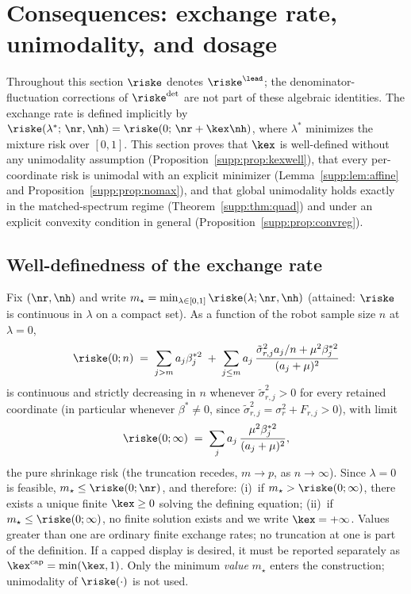 \section{Consequences: exchange rate, unimodality, and dosage}
\label{supp:t2}

Throughout this section $\riske$ denotes $\riske^{\lead}$; the denominator-fluctuation corrections of $\riske^{\det}$ are not part of these algebraic identities.
The exchange rate is defined implicitly by $\riske(\lambda^*;\, \nr, \nh) = \riske(0;\, \nr + \kex\nh)$, where $\lambda^*$ minimizes the mixture risk over $[0,1]$.
This section proves that $\kex$ is well-defined without any unimodality assumption (Proposition~\ref{supp:prop:kexwell}), that every per-coordinate risk is unimodal with an explicit minimizer (Lemma~\ref{supp:lem:affine} and Proposition~\ref{supp:prop:nomax}), and that global unimodality holds exactly in the matched-spectrum regime (Theorem~\ref{supp:thm:quad}) and under an explicit convexity condition in general (Proposition~\ref{supp:prop:convreg}).

\subsection{Well-definedness of the exchange rate}

\begin{proposition}\label{supp:prop:kexwell}
Fix $(\nr,\nh)$ and write $m_\star = \min_{\lambda \in [0,1]} \riske(\lambda; \nr, \nh)$ (attained: $\riske$ is continuous in $\lambda$ on a compact set).
As a function of the robot sample size $n$ at $\lambda = 0$,
\begin{equation}
\riske(0; n) \;=\; \sum_{j > m} a_j \beta_j^{*2} \;+\; \sum_{j \le m} a_j\, \frac{\tilde\sigma_{r,j}^2 a_j / n + \mu^2 \beta_j^{*2}}{(a_j + \mu)^2}
\end{equation}
is continuous and strictly decreasing in $n$ whenever $\tilde\sigma_{r,j}^2 > 0$ for every retained coordinate (in particular whenever $\beta^* \neq 0$, since $\tilde\sigma_{r,j}^2 = \sigma_r^2 + F_{r,j} > 0$), with limit
\begin{equation}
\riske(0; \infty) \;=\; \sum_{j} a_j\, \frac{\mu^2 \beta_j^{*2}}{(a_j + \mu)^2},
\end{equation}
the pure shrinkage risk (the truncation recedes, $m \to p$, as $n \to \infty$).
Since $\lambda = 0$ is feasible, $m_\star \le \riske(0; \nr)$, and therefore:
(i)~if $m_\star > \riske(0; \infty)$, there exists a unique finite $\kex \ge 0$ solving the defining equation;
(ii)~if $m_\star \le \riske(0; \infty)$, no finite solution exists and we write $\kex = +\infty$.
Values greater than one are ordinary finite exchange rates; no truncation at one is part of the definition.
If a capped display is desired, it must be reported separately as $\kex^{\mathrm{cap}}=\min(\kex,1)$.
Only the minimum \emph{value} $m_\star$ enters the construction; unimodality of $\riske(\cdot)$ is not used.
\end{proposition}

